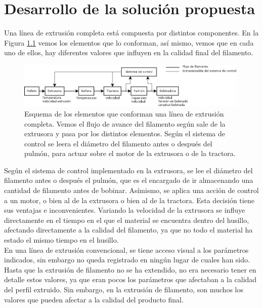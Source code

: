 \chapter{Desarrollo de la solución propuesta}
\label{cap:descrip}

Una línea de extrusión completa está compuesta por distintos componentes. En la Figura \ref{fig:esquema_extrusora} vemos los elementos que lo conforman, así mismo, vemos que en cada uno de ellos, hay diferentes valores que influyen en la calidad final del filamento.

\begin{figure}[H]
    \centering
    \includegraphics[width=0.99\textwidth]{images/esquema_extrusion.png}
    \caption[Esquema de los elementos que conforman una extrusora.]{Esquema de los elementos que conforman una línea de extrusión completa. Vemos el flujo de avance del filamento según sale de la extrusora y pasa por los distintos elementos. Según el sistema de control se leera el diámetro del filamento antes o después del pulmón, para actuar sobre el motor de la extrusora o de la tractora.}
    \label{fig:esquema_extrusora}
\end{figure}

Según el sistema de control implementado en la extrusora, se lee el diámetro del filamento antes o después el pulmón, que es el encargado de ir almacenando una cantidad de filamento antes de bobinar. Asímismo, se aplica una acción de control a un motor, o bien al de la extrusora o bien al de la tractora. Esta decisión tiene sus ventajas e inconvenientes. Variando la velocidad de la extrusora se influye directamente en el tiempo en el que el material se encuentra dentro del husillo, afectando directamente a la calidad del filamento, ya que no todo el material ha estado el mismo tiempo en el husillo.\\

En una línea de extrusión convencional, se tiene acceso visual a los parámetros indicados, sin embargo no queda registrado en ningún lugar de cuales han sido. Hasta que la extrusión de filamento no se ha extendido, no era necesario tener en detalle estos valores, ya que eran pocos los parámetros que afectaban a la calidad del perfil extruido. Sin embargo, en la extrusión de filamento, son muchos los valores que pueden afectar a la calidad del producto final.\\


